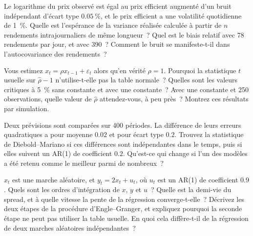 \begin{question}\label{iq:iv1:time-series:10}
Le logarithme du prix observé est égal au prix efficient augmenté d'un bruit indépendant d'écart type $0.05~\%$, et le prix efficient a une volatilité quotidienne de 1~\%. Quelle est l'espérance de la variance réalisée calculée à partir de $n$ rendements intrajournaliers de même longueur~? Quel est le biais relatif avec 78 rendements par jour, et avec 390~? Comment le bruit se manifeste-t-il dans l'autocovariance des rendements~?
\end{question}

\begin{question}\label{iq:iv1:time-series:11}
Vous estimez $x_t = \rho x_{t-1} + \varepsilon_t$ alors qu'en vérité $\rho = 1$. Pourquoi la statistique $t$ usuelle sur $\hat{\rho} - 1$ n'utilise-t-elle pas la table normale~? Quelles sont les valeurs critiques à 5~\% sans constante et avec une constante~? Avec une constante et 250 observations, quelle valeur de $\hat{\rho}$ attendez-vous, à peu près~? Montrez ces résultats par simulation.
\end{question}

\begin{question}\label{iq:iv1:time-series:12}
Deux prévisions sont comparées sur 400 périodes. La différence de leurs erreurs quadratiques a pour moyenne $0.02$ et pour écart type $0.2$. Trouvez la statistique de Diebold--Mariano si ces différences sont indépendantes dans le temps, puis si elles suivent un AR(1) de coefficient $0.2$. Qu'est-ce qui change si l'un des modèles a été retenu comme le meilleur parmi de nombreux~?
\end{question}

\begin{question}\label{iq:iv1:time-series:13}
$x_t$ est une marche aléatoire, et $y_t = 2x_t + u_t$, où $u_t$ est un AR(1) de coefficient $0.9$. Quels sont les ordres d'intégration de $x$, $y$ et $u$~? Quelle est la demi-vie du spread, et à quelle vitesse la pente de la régression converge-t-elle~? Décrivez les deux étapes de la procédure d'Engle--Granger, et expliquez pourquoi la seconde étape ne peut pas utiliser la table usuelle. En quoi cela diffère-t-il de la régression de deux marches aléatoires indépendantes~?
\end{question}

